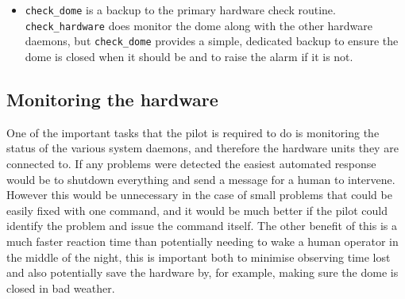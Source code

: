 \begin{colsection}
\begin{colsection}
\begin{itemize}
\item \texttt{check\_dome} is a backup to the primary hardware check routine. \texttt{check\_hardware} does monitor the dome along with the other hardware daemons, but \texttt{check\_dome} provides a simple, dedicated backup to ensure the dome is closed when it should be and to raise the alarm if it is not.

\end{itemize}

\end{colsection}

\newpage
\subsection{Monitoring the hardware}
\label{sec:monitors}
\begin{colsection}

One of the important tasks that the pilot is required to do is monitoring the status of the various system daemons, and therefore the hardware units they are connected to. If any problems were detected the easiest automated response would be to shutdown everything and send a message for a human to intervene. However this would be unnecessary in the case of small problems that could be easily fixed with one command, and it would be much better if the pilot could identify the problem and issue the command itself. The other benefit of this is a much faster reaction time than potentially needing to wake a human operator in the middle of the night, this is important both to minimise observing time lost and also potentially save the hardware by, for example, making sure the dome is closed in bad weather.


\end{colsection}
\end{colsection}
